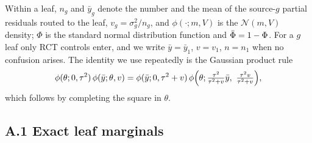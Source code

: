 \documentclass[11pt]{article}
\newcommand{\Normal}{\mathcal{N}}
\theoremstyle{definition}
\theoremstyle{plain}
\begin{document}
{Within a leaf, $n_g$ and $\bar y_g$ denote the number and the mean of the source-$g$ partial residuals routed to the leaf, $v_g=\sigma_g^2/n_g$, and $\phi(\cdot;m,V)$ is the $\Normal(m,V)$ density; $\Phi$ is the standard normal distribution function and $\bar\Phi=1-\Phi$. For a $g$ leaf only RCT controls enter, and we write $\bar y=\bar y_1$, $v=v_1$, $n=n_1$ when no confusion arises. The identity we use repeatedly is the Gaussian product rule
\begin{equation}
\phi(\theta;0,\tau^2)\,\phi(\bar y;\theta,v)=\phi(\bar y;0,\tau^2+v)\,\phi\Bigl(\theta;\tfrac{\tau^2}{\tau^2+v}\bar y,\ \tfrac{\tau^2 v}{\tau^2+v}\Bigr),
\label{eq:gaussprod}
\end{equation}
which follows by completing the square in $\theta$.

\subsection*{A.1 Exact leaf marginals}

}
\end{document}
